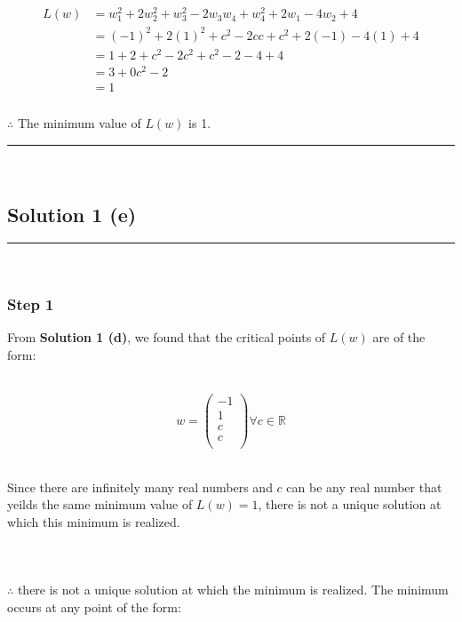 \documentclass{article}
\begin{document}
\begin{align*}
L(w) &= w_{1}^{2}+2w_{2}^{2}+w_{3}^{2}-2w_{3}w_{4}+w_{4}^{2}+2w_{1}-4w_{2}+4 \\
&= (-1)^{2}+2(1)^{2}+c^{2}-2cc+c^{2}+2(-1)-4(1)+4 \\
&= 1+2+c^{2}-2c^{2}+c^{2}-2-4+4 \\
&= 3+0c^{2}-2 \\
&= 1
\end{align*}

\subsubsection*{\normalfont}{$\therefore$ The minimum value of $L(w)$ is 1.}\\

\noindent\rule{\textwidth}{0.4pt}\\

\newpage

\subsection*{Solution 1 (e)}
\noindent\rule{\textwidth}{0.4pt}\\

\subsubsection*{Step 1}
\parbox{\textwidth}{
From \textbf{Solution 1 (d)}, we found that the critical points of $L(w)$ are of the form:
}\\

$$w = \begin{pmatrix}
  -1 \\
   1 \\
   c \\
   c \\
\end{pmatrix} \forall c \in \mathbb{R}
$$\\

\parbox{\textwidth}{
Since there are infinitely many real numbers and $c$ can be any real number that yeilds the same minimum value of $L(w) = 1$, there is not a unique solution at which this minimum is realized.
}\\

\subsubsection*{\normalfont}{$\therefore$ there is not a unique solution at which the minimum is realized. The minimum occurs at any point of the form:}\\
\end{document}
